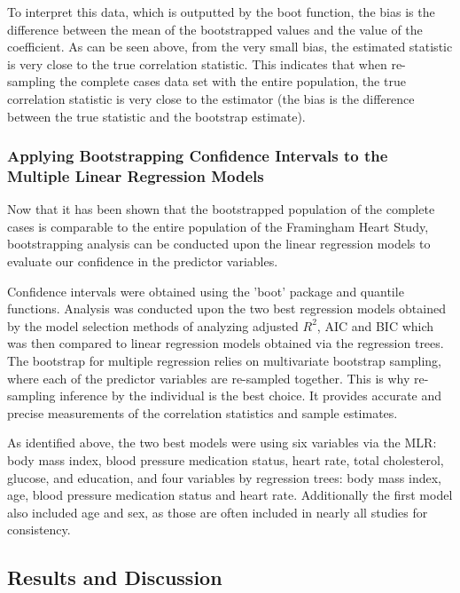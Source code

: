 \documentclass{article}\usepackage[]{graphicx}\usepackage[]{color}
\begin{document}
To interpret this data, which is outputted by the boot function, the bias is the difference between the mean of the bootstrapped values and the value of the coefficient.  As can be seen above, from the very small bias, the estimated statistic is very close to the true correlation statistic.  This indicates that when re-sampling the complete cases data set with the entire population, the true correlation statistic is very close to the estimator (the bias is the difference between the true statistic and the bootstrap estimate).  








\subsubsection*{Applying Bootstrapping Confidence Intervals to the Multiple Linear Regression Models}

Now that it has been shown that the bootstrapped population of the complete cases is comparable to the entire population of the Framingham Heart Study, bootstrapping analysis can be conducted upon the linear regression models to evaluate our confidence in the predictor variables.

Confidence intervals were obtained using the 'boot' package and quantile functions. Analysis was conducted upon the two best regression models obtained by the model selection methods of analyzing adjusted $R^2$, AIC and BIC which was then compared to linear regression models obtained via the regression trees.  The bootstrap for multiple regression relies on multivariate bootstrap sampling, where each of the predictor variables are re-sampled together. This is why re-sampling inference by the individual is the best choice. It provides accurate and precise measurements of the correlation statistics and sample estimates.

As identified above, the two best models were using six variables via the MLR: body mass index, blood pressure medication status, heart rate, total cholesterol, glucose, and education, and four variables by regression trees: body mass index, age, blood pressure medication status and heart rate.  Additionally the first model also included age and sex, as those are often included in nearly all studies for consistency. 

\subsection{Results and Discussion}
\end{document}
